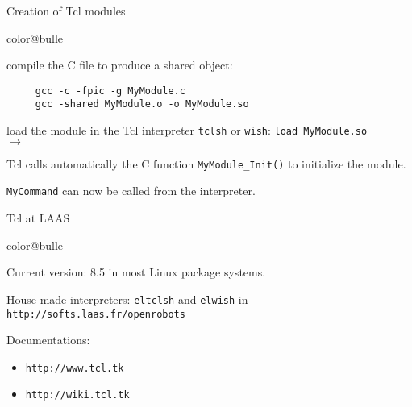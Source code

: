 \documentclass[a4paper,landscape,smooth]{show}
\newcommand{\tclex}[2]{\texttt{#1}\\$\rightarrow$ \texttt{#2}}
\begin{document}

\begin{tslide}{Creation of Tcl modules}
   \vfill
   \begin{bitemize}{color@bulle}
      \item compile the C file to produce a shared object:
      \begin{verbatim}
	 gcc -c -fpic -g MyModule.c
	 gcc -shared MyModule.o -o MyModule.so
      \end{verbatim}

      \item load the module in the Tcl interpreter \texttt{tclsh} or
	 \texttt{wish}:
	    \tclex{load MyModule.so}{}\\
      \item Tcl calls automatically the C function
	 \texttt{MyModule\_Init()} to initialize the module.

      \item \texttt{MyCommand} can now be called from the
	 interpreter. 
   \end{bitemize}
   \vfill
\end{tslide}


\begin{part}{}{Tcl at LAAS}
   \vfill
   \begin{bitemize}{color@bulle}
      \item Current version: 8.5 in most Linux package systems.
      \item House-made interpreters: \texttt{eltclsh} and \texttt{elwish} in
	    \texttt{http://softs.laas.fr/openrobots}
      \item Documentations:
	 \begin{itemize}
	    \item \texttt{http://www.tcl.tk}
	    \item \texttt{http://wiki.tcl.tk}
	 \end{itemize}
   \end{bitemize}
   \vfill
\end{part}
\end{document}
